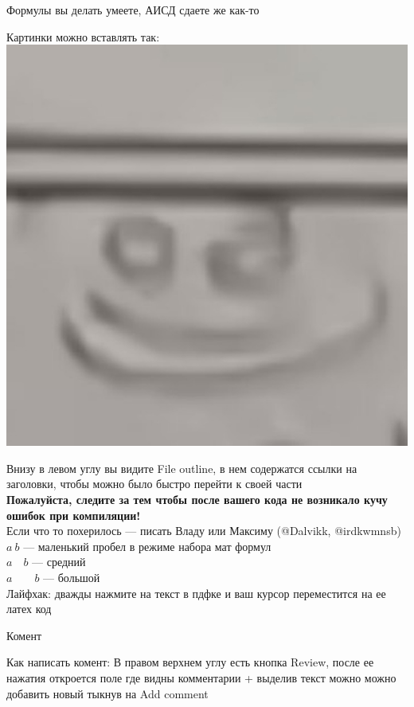 Формулы вы делать умеете, АИСД сдаете же как-то

Картинки можно вставлять так: \\
\includegraphics[scale = 0.5]{Images/smile.jpeg}

Внизу в левом углу вы видите File outline, в нем содержатся ссылки на заголовки, чтобы можно было быстро перейти к своей части \\
\textbf{Пожалуйста, следите за тем чтобы после вашего кода не возникало кучу ошибок при компиляции!} \\
Если что то похерилось --- писать Владу или Максиму (@Dalvikk, @irdkwmnsb) \\
    $a \ b$  --- маленький пробел в режиме набора мат формул \\
    $a \quad b$   --- средний \\ 
    $a \qquad b$  --- большой \\

Лайфхак: дважды нажмите на текст в пдфке и ваш курсор переместится на ее латех код

Комент

Как написать комент: В правом верхнем углу есть кнопка Review, после ее нажатия откроется поле где видны комментарии + выделив текст можно можно добавить новый тыкнув на Add comment
\newpage
